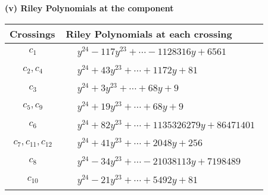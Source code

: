 \documentclass[1p]{elsarticle_modified}
\theoremstyle{definition}
\begin{document}
\newpage\renewcommand{\arraystretch}{1}
\flushleft \textbf{(v) Riley Polynomials at the component}\newline \\
\begin{tabular}{m{50pt}|m{274pt}}
Crossings & \hspace{64pt}Riley Polynomials at each crossing \\
\hline $$\begin{aligned}c_{1}\end{aligned}$$&$\begin{aligned}
&y^{24}-117 y^{23}+\cdots-1128316 y+6561
\end{aligned}$\\
\hline $$\begin{aligned}c_{2},c_{4}\end{aligned}$$&$\begin{aligned}
&y^{24}+43 y^{23}+\cdots+1172 y+81
\end{aligned}$\\
\hline $$\begin{aligned}c_{3}\end{aligned}$$&$\begin{aligned}
&y^{24}+3 y^{23}+\cdots+68 y+9
\end{aligned}$\\
\hline $$\begin{aligned}c_{5},c_{9}\end{aligned}$$&$\begin{aligned}
&y^{24}+19 y^{23}+\cdots+68 y+9
\end{aligned}$\\
\hline $$\begin{aligned}c_{6}\end{aligned}$$&$\begin{aligned}
&y^{24}+82 y^{23}+\cdots+1135326279 y+86471401
\end{aligned}$\\
\hline $$\begin{aligned}c_{7},c_{11},c_{12}\end{aligned}$$&$\begin{aligned}
&y^{24}+41 y^{23}+\cdots+2048 y+256
\end{aligned}$\\
\hline $$\begin{aligned}c_{8}\end{aligned}$$&$\begin{aligned}
&y^{24}-34 y^{23}+\cdots-21038113 y+7198489
\end{aligned}$\\
\hline $$\begin{aligned}c_{10}\end{aligned}$$&$\begin{aligned}
&y^{24}-21 y^{23}+\cdots+5492 y+81
\end{aligned}$\\
\hline
\end{tabular}\\~\\
\end{document}
